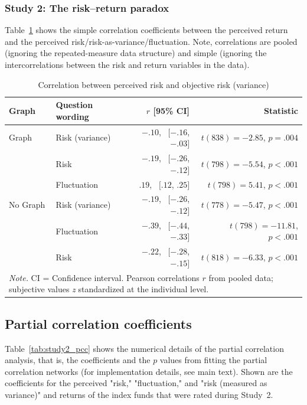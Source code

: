 \subsubsection{Study 2: The risk--return paradox}
Table~\ref{tab:study2_rr} shows the simple correlation coefficients between the perceived return and the perceived risk/risk-as-variance/fluctuation. Note, correlations are pooled (ignoring the repeated-measure data structure) and simple (ignoring the intercorrelations between the risk and return variables in the data).
\begin{table}[h!t]
\centering
\caption{Correlation between perceived risk and objective risk (variance)}
\label{tab:study2_rr}
\begin{tabular}{llrr}
 Graph & Question wording & $r$ [95\% CI] & Statistic \\ 
  \midrule
Graph & Risk (variance) & $-.10$, \  $[-.16$, $-.03]$ & $t(838) = -2.85$, $p = .004$ \\ 
   & Risk & $-.19$, \  $[-.26$, $-.12]$ & $t(798) = -5.54$, $p < .001$ \\ 
   & Fluctuation & $.19$, \  $[.12$, $.25]$ & $t(798) = 5.41$, $p < .001$ \\ 
   \midrule
No Graph & Risk (variance) & $-.19$, \  $[-.26$, $-.12]$ & $t(778) = -5.47$, $p < .001$ \\ 
   & Fluctuation & $-.39$, \  $[-.44$, $-.33]$ & $t(798) = -11.81$, $p < .001$ \\ 
   & Risk & $-.22$, \  $[-.28$, $-.15]$ & $t(818) = -6.33$, $p < .001$ \\ 
   \bottomrule
\multicolumn{4}{l}{{\textit{Note.} CI = Confidence interval. Pearson correlations $r$ from pooled data; subjective values \textit{z} standardized at the individual level.}}
\end{tabular}
\end{table}







\newpage
\subsection{Partial correlation coefficients}
Table~\ref{tab:study2_pcc} shows the numerical details of the partial correlation analysis, that is, the coefficients and the $p$ values from fitting the partial correlation networks (for implementation details, see main text). Shown are the coefficients for the perceived "risk," "fluctuation," and  "risk (measured as variance)" and returns of the index funds that were rated during Study~2.


